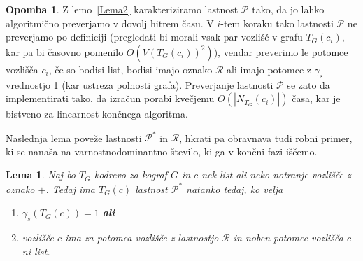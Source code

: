 \documentclass[12pt,a4paper,twoside]{article}
\theoremstyle{definition} %
\newtheorem{opomba}[definicija]{Opomba}
\theoremstyle{plain} %
\newtheorem{lema}[definicija]{Lema}
\numberwithin{equation}{section}  %
\begin{document}
\begin{opomba}\label{opombaLema2}
Z lemo~\ref{Lema2} karakteriziramo lastnost $\mathcal{P}$ tako, da jo lahko algoritmično preverjamo v dovolj hitrem času. V $i$-tem koraku tako lastnosti $\mathcal{P}$ ne preverjamo po definiciji (pregledati bi morali vsak par vozlišč v grafu $T_G(c_i)$, kar pa bi časovno pomenilo $O(V(T_G(c_i))^2)$), vendar preverimo le potomce vozlišča $c_i$, če so bodisi list, bodisi imajo oznako $\mathcal{R}$ ali imajo potomce z $\gamma_s$ vrednostjo 1 (kar ustreza polnosti grafa). Preverjanje lastnosti $\mathcal{P}$ se zato da implementirati tako, da izračun porabi kvečjemu $O(|N_{T_G}(c_i)|)$ časa, kar je bistveno za linearnost končnega algoritma.
\end{opomba}

Naslednja lema poveže lastnosti $\mathcal{P^*}$ in $\mathcal{R}$, hkrati pa obravnava tudi robni primer, ki se nanaša na varnostnodominantno število, ki ga v končni fazi iščemo.
\begin{lema}\label{Lema3}Naj bo $T_G$ kodrevo za kograf $G$ in $c$ nek list ali neko notranje vozlišče z oznako $+$. Tedaj ima $T_G(c)$ lastnost $\mathcal{P^*}$ natanko tedaj, ko velja
\begin{enumerate}[label=($\roman*$)]
\item $\gamma_s(T_G(c))=1$ \textbf{ali}
\item vozlišče $c$ ima za potomca vozlišče z lastnostjo $\mathcal{R}$ in noben potomec vozlišča $c$ ni list.
\end{enumerate}
\end{lema}
\end{document}
